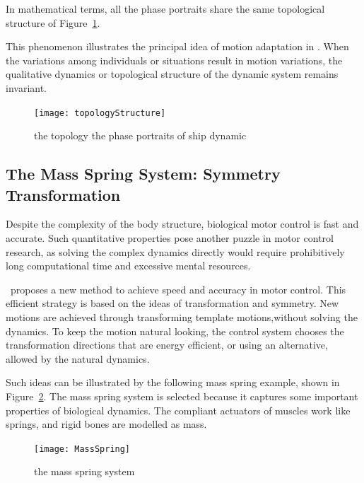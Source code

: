 In mathematical terms, all the phase portraits share the same topological structure of Figure~\ref{fig:topologyStructure}.

This phenomenon illustrates the principal idea of motion adaptation in {\moit}.
When the variations among individuals or situations result in motion variations, the qualitative dynamics or topological structure of the dynamic system remains invariant.

\begin{figure}[!htbp]
  \begin{center}
   \texttt{[image: topologyStructure]}
   \caption{the topology  the phase portraits of ship dynamic}
   \label{fig:topologyStructure}
  \end{center}
\end{figure}




\subsection{The Mass Spring System:  Symmetry Transformation}
Despite the complexity of the body structure, biological motor control is fast and accurate.
Such quantitative properties pose another puzzle in motor control research, as solving the complex dynamics directly would require prohibitively long computational time and excessive mental resources.

{\moit}\ proposes a new method to achieve speed and accuracy in motor control.
This efficient strategy is based on the ideas of transformation and symmetry.
New motions are achieved through transforming template motions,without solving the dynamics. 
To keep the motion natural looking, the control system chooses the transformation directions that are energy efficient, or using an alternative, allowed by the natural dynamics.


Such ideas can be illustrated by the following mass spring example, shown in Figure~\ref{fig:massspring}.
The mass spring system is selected because it captures some important properties of biological dynamics.
The compliant actuators of muscles work like springs, and rigid bones are modelled as mass.


\begin{figure}[!htbp]
  \begin{center}
    \texttt{[image: MassSpring]}
    \caption{the mass spring system}
    \label{fig:massspring}
  \end{center}
\end{figure}

